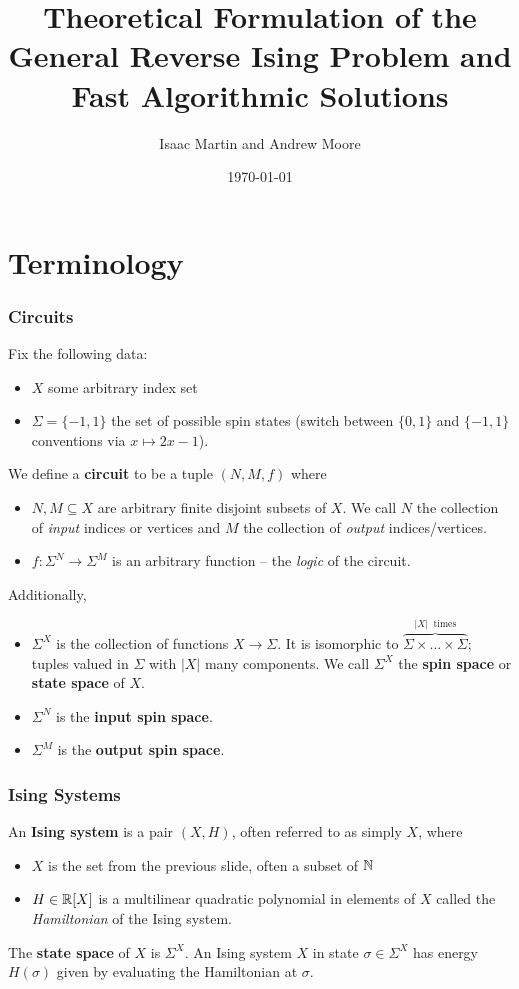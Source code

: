 \documentclass[8pt, mathserif, notheorems]{beamer}
\title{Theoretical Formulation of the General Reverse Ising Problem and Fast Algorithmic Solutions}
\author{Isaac Martin and Andrew Moore}
\institute{University of Texas at Austin}
\date{\today}
\begin{document}
\frame{\titlepage}

\section{Terminology}
\begin{frame}[t]\frametitle{Circuits}
  Fix the following data:
  \begin{itemize}
    \item $X$ some arbitrary index set
    \item $\Sigma = \{-1,1\}$ the set of possible spin states (switch between $\{0,1\}$ and $\{-1,1\}$ conventions via $x \mapsto 2x - 1$).
  \end{itemize}
  \bigskip

We define a \textbf{circuit} to be a tuple $(N,M,f)$ where
    \begin{itemize}    
        \item $N, M \subseteq X$ are arbitrary finite disjoint subsets of $X$. We call $N$ the collection of \textit{input} indices or vertices and $M$ the collection of \textit{output} indices/vertices.
        \item $f: \Sigma^N \to \Sigma^M$ is an arbitrary function -- the \textit{logic} of the circuit.
    \end{itemize}    
    \bigskip

    Additionally,
    \begin{itemize}
      \item $\Sigma^X$ is the collection of functions $X\to \Sigma$. It is isomorphic to $\overbrace{\Sigma\times ...\times \Sigma}^{|X| ~\text{ times}}$; tuples valued in $\Sigma$ with $|X|$ many components. We call $\Sigma^X$ the \textbf{spin space} or \textbf{state space} of $X$.
      \item $\Sigma^N$ is the \textbf{input spin space}.
      \item $\Sigma^M$ is the \textbf{output spin space}.
    \end{itemize}
\end{frame}
\begin{frame}[c]\frametitle{Ising Systems}

  An \textbf{Ising system} is a pair $(X, H)$, often referred to as simply $X$, where

  \bigskip

  \begin{itemize}
    \item $X$ is the set from the previous slide, often a subset of $\mathbb{N}$ 
        \bigskip

    \item $H \in \mathbb{R}[X]$ is a multilinear quadratic polynomial in elements of $X$ called the \textit{Hamiltonian} of the Ising system.
  \end{itemize}

  \bigskip

  The \textbf{state space} of $X$ is $\Sigma^X$. An Ising system $X$ in state $\sigma \in \Sigma^X$ has energy $H(\sigma)$ given by evaluating the Hamiltonian at $\sigma$.
\end{frame}
\end{document}

